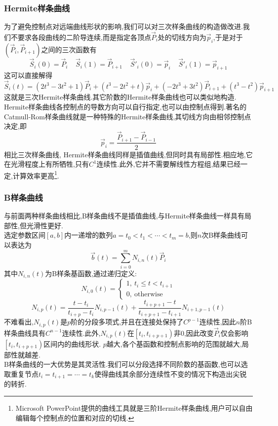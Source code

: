 \documentclass{ctexart}
\begin{document}
\subsubsection{Hermite样条曲线}
为了避免控制点对远端曲线形状的影响,我们可以对三次样条曲线的构造做改进.我们不要求各段曲线的二阶导连续,而是指定各顶点$\vec{P}_i$处的切线方向为$\vec{p}_i$,于是对于$\left(\vec{P}_i,\vec{P}_{i+1}\right)$之间的三次函数有
\[\vec{S}_i(0)=\vec{P}_i\ \ \ \ \ \vec{S}_i(1)=\vec{P}_{i+1}\ \ \ \ \ \vec{S}'_i(0)=\vec{p}_i\ \ \ \ \ \vec{S}'_i(1)=\vec{p}_{i+1}\]
这可以直接解得
\[\vec{S}_i(t)=\left(2t^3-3t^2+1\right)\vec{P}_i+\left(t^3-2t^2+t\right)\vec{p}_i+\left(-2t^3+3t^2\right)\vec{P}_{i+1}+\left(t^3-t^2\right)\vec{p}_{i+1}\]
这就是三次Hermite样条曲线.其它阶数的Hermite样条曲线也可以类似地构造.\\
\indent Hermite样条曲线各控制点的导数方向可以自行指定,也可以由控制点得到.著名的Catmull-Rom样条曲线就是一种特殊的Hermite样条曲线,其切线方向由相邻控制点决定,即
\[\vec{p}_i=\dfrac{\vec{P}_{i+1}-\vec{P}_{i-1}}{2}\]
相比三次样条曲线, Hermite样条曲线同样是插值曲线,但同时具有局部性.相应地,它在光滑程度上有所牺牲,只有$C^1$连续性.此外,它并不需要解线性方程组,结果已经一定,计算效率更高\footnote{Microsoft PowerPoint提供的曲线工具就是三阶Hermite样条曲线,用户可以自由编辑每个控制点的位置和对应的切线.}.
\subsubsection{B样条曲线}
与前面两种样条曲线相比,B样条曲线不是插值曲线,与Hermite样条曲线一样具有局部性,但光滑性更好.\\
\indent 选定参数区间$[a,b]$内一递增的数列$a=t_0<t_1<\cdots<t_m=b$,则$n$次B样条曲线可以表达为
\[\vec{b}(t)=\sum_{i=0}^{m}N_{i,n}(t)\vec{P}_i\]
其中$N_{i,n}(t)$为B样条基函数,通过递归定义:
\[N_{i,0}(t)=\left\{\begin{array}{l}
    1,\ t_i\leqslant t<t_{i+1}\\
    0,\ \text{otherwise}
\end{array}\right.\]
\[N_{i,p}(t)=\dfrac{t-t_i}{t_{i+p}-t_i}N_{i,p-1}(t)+\dfrac{t_{i+p+1}-t}{t_{i+p+1}-t_{i+1}}N_{i+1,p-1}(t)\]
不难看出,$N_{i,p}(t)$是$p$阶的分段多项式,并且在连接处保持了$C^{p-1}$连续性,因此$n$阶B样条曲线具有$C^{n-1}$连续性.此外,$N_{i,p}(t)$在$\left[t_i,t_{i+p+1}\right)$非$0$,因此改变$\vec{P}_i$仅会影响$\left[t_i,t_{i+p+1}\right)$区间内的曲线形状. $p$越大,各个基函数和控制点影响的范围就越大,局部性就越差.\\
\indent B样条曲线的一大优势是其灵活性.我们可以分段选择不同阶数的基函数,也可以选取重复节点$t_i=t_{i+1}=\cdots=t_{k}$使得曲线其余部分连续性不变的情况下构造出尖锐的转折.
\end{document}
